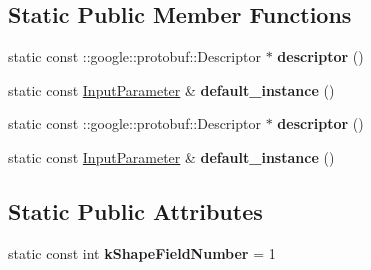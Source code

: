 \subsection*{Static Public Member Functions}
\begin{DoxyCompactItemize}
\item 
\mbox{\label{classcaffe_1_1_input_parameter_a2e2345d8d18b30d1d55488ac901e06e6}} 
static const \+::google\+::protobuf\+::\+Descriptor $\ast$ {\bfseries descriptor} ()
\item 
\mbox{\label{classcaffe_1_1_input_parameter_aeec37a5032d2dcc29d8fa5414c939b74}} 
static const \mbox{\hyperlink{classcaffe_1_1_input_parameter}{Input\+Parameter}} \& {\bfseries default\+\_\+instance} ()
\item 
\mbox{\label{classcaffe_1_1_input_parameter_a0c0bce040cc75db38e5030d1539c62dd}} 
static const \+::google\+::protobuf\+::\+Descriptor $\ast$ {\bfseries descriptor} ()
\item 
\mbox{\label{classcaffe_1_1_input_parameter_a5cc8411bce4c0418fad7b54c33c32254}} 
static const \mbox{\hyperlink{classcaffe_1_1_input_parameter}{Input\+Parameter}} \& {\bfseries default\+\_\+instance} ()
\end{DoxyCompactItemize}
\subsection*{Static Public Attributes}
\begin{DoxyCompactItemize}
\item 
\mbox{\label{classcaffe_1_1_input_parameter_a13ff36a7dd1f8d48aed63c1e11f1cd60}} 
static const int {\bfseries k\+Shape\+Field\+Number} = 1
\end{DoxyCompactItemize}

